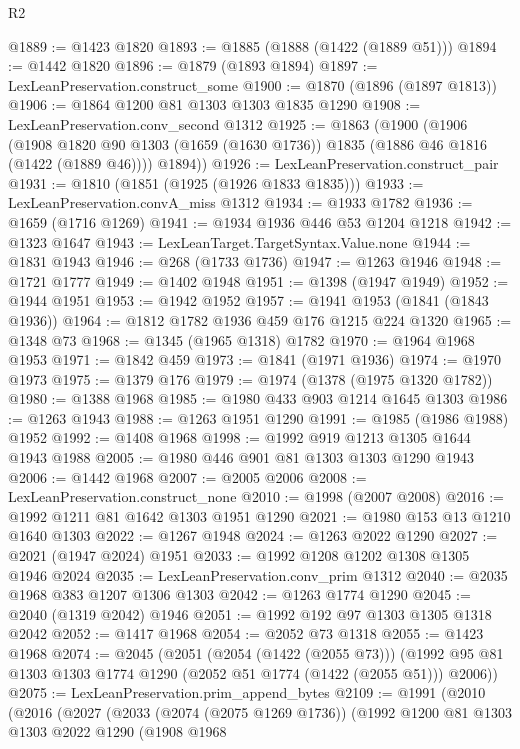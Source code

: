 \begin{lexlean}{R2}
\begin{coremodule}
{{{{{{{{{{{{{{{{{{{{{{{{{{{{{{{{{{{{{{{{{{{{{{@1889 := @1423 @1820
@1893 := @1885 (@1888 (@1422 (@1889 @51)))
@1894 := @1442 @1820
@1896 := @1879 (@1893 @1894)
@1897 := LexLeanPreservation.construct_some
@1900 := @1870 (@1896 (@1897 @1813))
@1906 := @1864 @1200 @81 @1303 @1303 @1835 @1290
@1908 := LexLeanPreservation.conv_second @1312
@1925 := @1863
    (@1900
      (@1906
        (@1908 @1820 @90 @1303 (@1659 (@1630 @1736)) @1835 (@1886 @46 @1816 (@1422 (@1889 @46))))
        @1894))
@1926 := LexLeanPreservation.construct_pair
@1931 := @1810 (@1851 (@1925 (@1926 @1833 @1835)))
@1933 := LexLeanPreservation.convA_miss @1312
@1934 := @1933 @1782
@1936 := @1659 (@1716 @1269)
@1941 := @1934 @1936 @446 @53 @1204 @1218
@1942 := @1323 @1647
@1943 := LexLeanTarget.TargetSyntax.Value.none
@1944 := @1831 @1943
@1946 := @268 (@1733 @1736)
@1947 := @1263 @1946
@1948 := @1721 @1777
@1949 := @1402 @1948
@1951 := @1398 (@1947 @1949)
@1952 := @1944 @1951
@1953 := @1942 @1952
@1957 := @1941 @1953 (@1841 (@1843 @1936))
@1964 := @1812 @1782 @1936 @459 @176 @1215 @224 @1320
@1965 := @1348 @73
@1968 := @1345 (@1965 @1318) @1782
@1970 := @1964 @1968 @1953
@1971 := @1842 @459
@1973 := @1841 (@1971 @1936)
@1974 := @1970 @1973
@1975 := @1379 @176
@1979 := @1974 (@1378 (@1975 @1320 @1782))
@1980 := @1388 @1968
@1985 := @1980 @433 @903 @1214 @1645 @1303
@1986 := @1263 @1943
@1988 := @1263 @1951 @1290
@1991 := @1985 (@1986 @1988) @1952
@1992 := @1408 @1968
@1998 := @1992 @919 @1213 @1305 @1644 @1943 @1988
@2005 := @1980 @446 @901 @81 @1303 @1303 @1290 @1943
@2006 := @1442 @1968
@2007 := @2005 @2006
@2008 := LexLeanPreservation.construct_none
@2010 := @1998 (@2007 @2008)
@2016 := @1992 @1211 @81 @1642 @1303 @1951 @1290
@2021 := @1980 @153 @13 @1210 @1640 @1303
@2022 := @1267 @1948
@2024 := @1263 @2022 @1290
@2027 := @2021 (@1947 @2024) @1951
@2033 := @1992 @1208 @1202 @1308 @1305 @1946 @2024
@2035 := LexLeanPreservation.conv_prim @1312
@2040 := @2035 @1968 @383 @1207 @1306 @1303
@2042 := @1263 @1774 @1290
@2045 := @2040 (@1319 @2042) @1946
@2051 := @1992 @192 @97 @1303 @1305 @1318 @2042
@2052 := @1417 @1968
@2054 := @2052 @73 @1318
@2055 := @1423 @1968
@2074 := @2045
    (@2051
      (@2054 (@1422 (@2055 @73)))
      (@1992 @95 @81 @1303 @1303 @1774 @1290 (@2052 @51 @1774 (@1422 (@2055 @51))) @2006))
@2075 := LexLeanPreservation.prim_append_bytes
@2109 := @1991
    (@2010
      (@2016
        (@2027
          (@2033
            (@2074 (@2075 @1269 @1736))
            (@1992
              @1200
              @81
              @1303
              @1303
              @2022
              @1290
              (@1908
                @1968
}}}}}}}}}}}}}}}}}}}}}}}}}}}}}}}}}}}}}}}}}}}}}}
\end{coremodule}
\end{lexlean}
